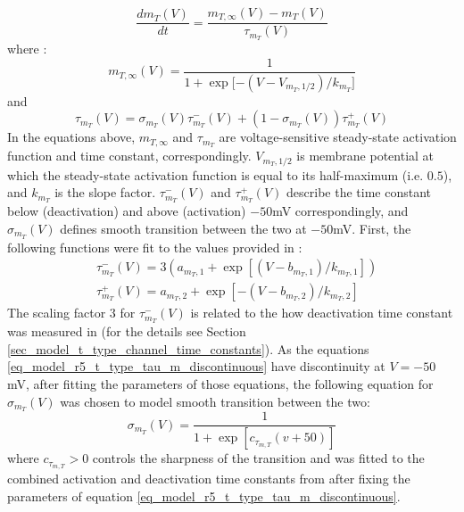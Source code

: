 \documentclass[../../workflow.tex]{subfiles}
\begin{document}
\begin{equation*}
    \frac{dm_T(V)}{dt} = \frac{m_{T,\infty}(V) - m_T(V)}{\tau_{m_T}(V)}
\end{equation*}
where \parencite{coulterCalciumCurrentsRat1989,wangModelTtypeCalcium1991}:
\begin{equation}\label{eq_model_r5_t_type_steady_state_activation}
    m_{T,\infty}(V) = \frac{1}{1 + \exp{[-(V - V_{m_T,1/2})/k_{m_T}}]}
\end{equation}
and
\begin{equation}\label{eq_model_r5_t_type_tau_m}
    \tau_{m_T}(V) = \sigma_{m_T}(V) \tau_{m_T}^-(V) + (1 - \sigma_{m_T}(V))\tau_{m_T}^+(V)
\end{equation}
In the equations above, $m_{T,\infty}$ and $\tau_{m_T}$ are voltage-sensitive steady-state activation function
and time constant, correspondingly. $V_{m_T,1/2}$ is membrane potential at which the steady-state
activation function is equal to its half-maximum (i.e. $0.5$), and $k_{m_T}$ is the slope factor.
$\tau_{m_T}^-(V)$ and $\tau_{m_T}^+(V)$ describe the time constant below (deactivation) and
above (activation) $-50$mV correspondingly, and $\sigma_{m_T}(V)$ defines smooth transition between
the two at $-50$mV. First, the following functions were fit to the values provided in \parencite{jeongCaa1TFlyTtype2015}:
\begin{align}\label{eq_model_r5_t_type_tau_m_discontinuous}
    & \tau_{m_T}^-(V) = 3(a_{m_T,1} + \exp{[(V - b_{m_T,1})/k_{m_T,1}]})\\
    & \tau_{m_T}^+(V) = a_{m_T,2} + \exp{[-(V - b_{m_T,2})/k_{m_T,2}]}
\end{align}
The scaling factor $3$ for $\tau_{m_T}^-(V)$ is related to the how deactivation time constant was
measured in \parencite{jeongCaa1TFlyTtype2015} (for the details see Section \ref{sec_model_t_type_channel_time_constants}).
As the equations \ref{eq_model_r5_t_type_tau_m_discontinuous} have discontinuity at $V=-50$mV,
after fitting the parameters of those equations, the following equation for $\sigma_{m_T}(V)$
was chosen to model smooth transition between the two:
\begin{equation}\label{eq_model_r5_t_type_channel_tau_m_sigma}
    \sigma_{m_T}(V) = \frac{1}{1 + \exp{[ c_{\tau_{m,T}} (v + 50) ]}}
\end{equation}
where $c_{\tau_{m,T}}>0$ controls the sharpness of the transition and was fitted to the combined
activation and deactivation time constants from \parencite{jeongCaa1TFlyTtype2015} after fixing the
parameters of equation \ref{eq_model_r5_t_type_tau_m_discontinuous}.
\end{document}
